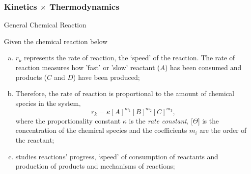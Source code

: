 \documentclass[10pt,compress,handout,unknownkeysallowed]{beamer}
\begin{document}
\begin{frame}
  \frametitle{Kinetics $\times$ Thermodynamics}

  \begin{block}{\begin{center}General Chemical Reaction\end{center}}
     Given the chemical reaction below
  \end{block}  

   \begin{enumerate}[a)]
       \item<1-> $r_{k}$ represents the rate of reaction, \ie the `speed' of the reaction. The rate of reaction measures how 'fast' or 'slow' reactant ($A$) has been consumed and products ($C$ and $D$) have been produced;
       \item<1-> Therefore, the rate of reaction is proportional to the amount of chemical species in the system, \eg
             \begin{displaymath}
                  r_{k} = \kappa [A]^{m_{1}}[B]^{m_{2}}[C]^{m_{3}},
             \end{displaymath}
             where the proportionality constant $\kappa$ is the {\it rate constant}, [$\Theta$] is the concentration of the chemical species and the coefficients $m_{i}$ are the order of the reactant;
       \item<1->  studies reactions' progress, \ie `speed' of consumption of reactants and production of products and mechanisms of reactions;
   \end{enumerate}
\end{frame}
\normalsize
\end{document}
